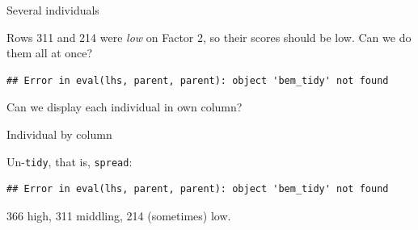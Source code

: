 \documentclass[ignorenonframetext,]{beamer}
\newenvironment{Shaded}{\begin{snugshade}}{\end{snugshade}}
\newcommand{\DecValTok}[1]{\textcolor[rgb]{0.00,0.00,0.81}{#1}}
\newcommand{\FloatTok}[1]{\textcolor[rgb]{0.00,0.00,0.81}{#1}}
\newcommand{\KeywordTok}[1]{\textcolor[rgb]{0.13,0.29,0.53}{\textbf{#1}}}
\newcommand{\NormalTok}[1]{#1}
\newcommand{\OperatorTok}[1]{\textcolor[rgb]{0.81,0.36,0.00}{\textbf{#1}}}
\newcommand{\StringTok}[1]{\textcolor[rgb]{0.31,0.60,0.02}{#1}}
\begin{document}
\begin{frame}[fragile]{Several individuals}
\protect\hypertarget{several-individuals}{}

Rows 311 and 214 were \emph{low} on Factor 2, so their scores should be
low. Can we do them all at once?

\begin{Shaded}
\end{Shaded}

\begin{verbatim}
## Error in eval(lhs, parent, parent): object 'bem_tidy' not found
\end{verbatim}

Can we display each individual in own column?

\end{frame}

\begin{frame}[fragile]{Individual by column}
\protect\hypertarget{individual-by-column}{}

Un-\texttt{tidy}, that is, \texttt{spread}:

\begin{Shaded}
\end{Shaded}

\begin{verbatim}
## Error in eval(lhs, parent, parent): object 'bem_tidy' not found
\end{verbatim}

366 high, 311 middling, 214 (sometimes) low.

\end{frame}
\end{document}

